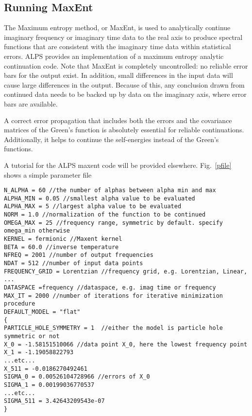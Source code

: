 \documentclass[aps,prb,floatfix,superscriptaddress,twocolumn,notitlepage]{revtex4-1}
\begin{document}
\subsection{Running MaxEnt}
The Maximum entropy method, or MaxEnt, is used to analytically continue imaginary frequency or imaginary time data to the real axis to produce spectral functions that are consistent with the imaginary time data within  statistical errors.\cite{Jarrell96} ALPS provides an implementation of a maximum entropy analytic continuation code. Note that MaxEnt is completely uncontrolled: no reliable error bars for the output exist. In addition, small differences in the input data will cause large differences in the output. Because of this, any conclusion drawn from continued data needs to be backed up by data on the imaginary axis, where error bars are available.

A correct error propagation that includes both the errors and the covariance matrices of the Green's function is absolutely essential for reliable continuations. Additionally, it helps to continue the self-energies instead of the Green's functions\cite{Wang09gap}.

A tutorial for the ALPS maxent code will be provided elsewhere. Fig.~\ref{pfile} shows a simple parameter file

\begin{figure*}
\begin{verbatim}
N_ALPHA = 60 //the number of alphas between alpha min and max
ALPHA_MIN = 0.05 //smallest alpha value to be evaluated
ALPHA_MAX = 5 //largest alpha value to be evaluated
NORM = 1.0 //normalization of the function to be continued
OMEGA_MAX = 25 //frequency range, symmetric by default. specify omega_min otherwise
KERNEL = fermionic //Maxent kernel
BETA = 60.0 //inverse temperature
NFREQ = 2001 //number of output frequencies
NDAT = 512 //number of input data points
FREQUENCY_GRID = Lorentzian //frequency grid, e.g. Lorentzian, Linear, ...
DATASPACE =frequency //dataspace, e.g. imag time or frequency
MAX_IT = 2000 //number of iterations for iterative minimization procedure
DEFAULT_MODEL = "flat"
{
PARTICLE_HOLE_SYMMETRY = 1  //either the model is particle hole symmetric or not
X_0 = -1.58151510066 //data point X_0, here the lowest frequency point
X_1 = -1.19058822793
...etc...
X_511 = -0.0186270492461
SIGMA_0 = 0.00526104728966 //errors of X_0
SIGMA_1 = 0.00199036770537
...etc...
SIGMA_511 = 3.42643209543e-07
}
\end{verbatim}
\caption{A simple parameter file for the maxent code.\label{pfile}}
\end{figure*}
\end{document}
